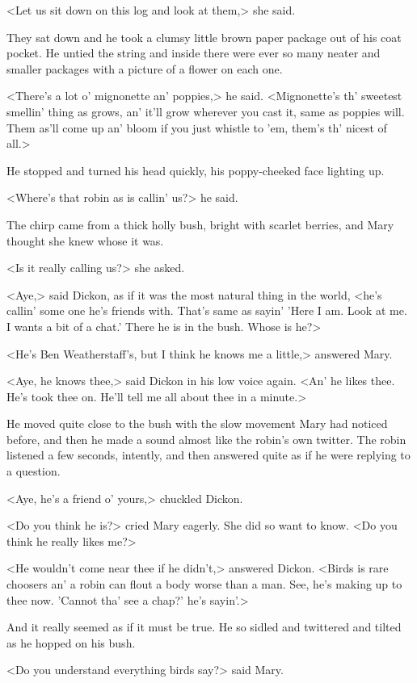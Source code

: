 <Let us sit down on this log and look at them,> she said.

They sat down and he took a clumsy little brown paper package out of his coat pocket. He untied the string and inside there were ever so many neater and smaller packages with a picture of a flower on each one.

<There's a lot o' mignonette an' poppies,> he said. <Mignonette's th' sweetest smellin' thing as grows, an' it'll grow wherever you cast it, same as poppies will. Them as'll come up an' bloom if you just whistle to 'em, them's th' nicest of all.>

He stopped and turned his head quickly, his poppy-cheeked face lighting up.

<Where's that robin as is callin' us?> he said.

The chirp came from a thick holly bush, bright with scarlet berries, and Mary thought she knew whose it was.

<Is it really calling us?> she asked.

<Aye,> said Dickon, as if it was the most natural thing in the world, <he's callin' some one he's friends with. That's same as sayin' 'Here I am. Look at me. I wants a bit of a chat.' There he is in the bush. Whose is he?>

<He's Ben Weatherstaff's, but I think he knows me a little,> answered Mary.

<Aye, he knows thee,> said Dickon in his low voice again. <An' he likes thee. He's took thee on. He'll tell me all about thee in a minute.>

He moved quite close to the bush with the slow movement Mary had noticed before, and then he made a sound almost like the robin's own twitter. The robin listened a few seconds, intently, and then answered quite as if he were replying to a question.

<Aye, he's a friend o' yours,> chuckled Dickon.

<Do you think he is?> cried Mary eagerly. She did so want to know. <Do you think he really likes me?>

<He wouldn't come near thee if he didn't,> answered Dickon. <Birds is rare choosers an' a robin can flout a body worse than a man. See, he's making up to thee now. 'Cannot tha' see a chap?' he's sayin'.>

And it really seemed as if it must be true. He so sidled and twittered and tilted as he hopped on his bush.

<Do you understand everything birds say?> said Mary.

